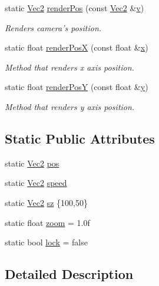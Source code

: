 \begin{DoxyCompactItemize}
static \hyperlink{class_vec2}{Vec2} \hyperlink{class_camera_a4ccd14db8379727d9d70b0fa66fb3b38}{render\-Pos} (const \hyperlink{class_vec2}{Vec2} \&\hyperlink{_s_d_l__opengl_8h_a10a82eabcb59d2fcd74acee063775f90}{v})
\begin{DoxyCompactList}\small\item\em Renders camera's position. \end{DoxyCompactList}\item 
static float \hyperlink{class_camera_ac4a2de1f750b4369c6651d59ea22a11a}{render\-Pos\-X} (const float \&\hyperlink{_s_d_l__opengl_8h_ad0e63d0edcdbd3d79554076bf309fd47}{x})
\begin{DoxyCompactList}\small\item\em Method that renders x axis position. \end{DoxyCompactList}\item 
static float \hyperlink{class_camera_adf553fbe1b8f7147d724dfc8f0fdf9c6}{render\-Pos\-Y} (const float \&\hyperlink{_s_d_l__opengl_8h_a1675d9d7bb68e1657ff028643b4037e3}{y})
\begin{DoxyCompactList}\small\item\em Method that renders y axis position. \end{DoxyCompactList}\end{DoxyCompactItemize}
\subsection*{Static Public Attributes}
\begin{DoxyCompactItemize}
\item 
static \hyperlink{class_vec2}{Vec2} \hyperlink{class_camera_a748c4e2867e34f45a431a1d2dcc6fee2}{pos}
\item 
static \hyperlink{class_vec2}{Vec2} \hyperlink{class_camera_aa0d0a54eb56182723dbd0ce61e0b3e8d}{speed}
\item 
static \hyperlink{class_vec2}{Vec2} \hyperlink{class_camera_a778d16b26445c706637ee754054d5f36}{sz} \{100,50\}
\item 
static float \hyperlink{class_camera_a21fc9e142b104d8e94126657abaa075f}{zoom} = 1.\-0f
\item 
static bool \hyperlink{class_camera_a0b9f6986a66a6ac5477e2beee00f0585}{lock} = false
\end{DoxyCompactItemize}


\subsection{Detailed Description}


